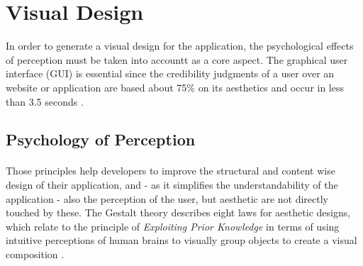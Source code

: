 \section{Visual Design}
In order to generate a visual design for the application, the psychological effects of perception must be taken into accountt as a core aspect. The graphical user interface (GUI) is essential since the credibility judgments of a user over an website or application are based about 75\% on its aesthetics and occur in less than 3.5 seconds \parencite[cf.][1]{Alsudani.2009}.
\subsection{Psychology of Perception}
\paragraph*{} Those principles help developers to improve the structural and content wise design of their application, and - as it simplifies the understandability of the application - also the perception of the user, but aesthetic are not directly touched by these. The Gestalt theory describes eight laws for aesthetic designs, which relate to the principle of \textit{Exploiting Prior Knowledge} in terms of using intuitive perceptions of human brains to visually group objects to create a visual composition \parencite[cf.][113]{Sternberg.2012}.
